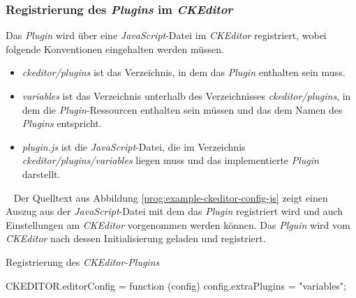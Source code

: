 \subsubsection{Registrierung des \emph{Plugins} im \emph{CKEditor}}
Das \emph{Plugin} wird über eine \emph{JavaScript}-Datei im \emph{CKEditor} registriert, wobei folgende Konventionen eingehalten werden müssen.
\begin{itemize}
	\item\emph{ckeditor/plugins}
	\newline
	ist das Verzeichnis, in dem das \emph{Plugin} enthalten sein muss.
	\item\emph{variables}
	\newline
	ist das Verzeichnis unterhalb des Verzeichnisses \emph{ckeditor/plugins}, in dem die \emph{Plugin}-Ressourcen enthalten sein müssen und das dem Namen des \emph{Plugins} entspricht.
	\item\emph{plugin.js}
	\newline
	ist die \emph{JavaScript}-Datei, die im Verzeichnis \emph{ckeditor/plugins/variables} liegen muss und das implementierte \emph{Plugin} darstellt. 
\end{itemize}
\ \newline
Der Quelltext aus Abbildung \ref{prog:example-ckeditor-config-js} zeigt einen Auszug aus der \emph{JavaScript}-Datei mit dem das \emph{Plugin} registriert wird und auch Einstellungen am \emph{CKEditor} vorgenommen werden können. Das \emph{Plguin} wird vom \emph{CKEditor} nach dessen Initialisierung geladen und registriert.

\begin{program}[h]
\caption{Registrierung des \emph{CKEditor-Plugins}}
\label{prog:example-ckeditor-config-js}
\begin{JsCode}
CKEDITOR.editorConfig = function (config) {
    config.extraPlugins = "variables";
}
\end{JsCode} 
\end{program}

